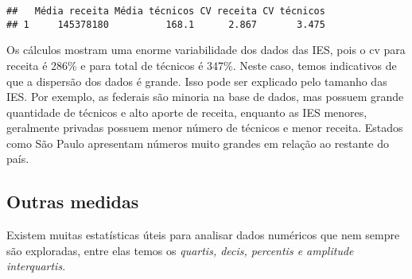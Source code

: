 \documentclass[11pt,]{style/krantz}
\makeatletter
\newenvironment{Shaded}{\begin{snugshade}}{\end{snugshade}}
\newcommand{\DataTypeTok}[1]{\textcolor[rgb]{0.13,0.29,0.53}{#1}}
\newcommand{\DecValTok}[1]{\textcolor[rgb]{0.00,0.00,0.81}{#1}}
\newcommand{\KeywordTok}[1]{\textcolor[rgb]{0.13,0.29,0.53}{\textbf{#1}}}
\newcommand{\NormalTok}[1]{#1}
\newcommand{\OperatorTok}[1]{\textcolor[rgb]{0.81,0.36,0.00}{\textbf{#1}}}
\newcommand{\StringTok}[1]{\textcolor[rgb]{0.31,0.60,0.02}{#1}}
\newenvironment{kframe}{%
\medskip{}
\setlength{\fboxsep}{.8em}
 \def\at@end@of@kframe{}%
 \ifinner\ifhmode%
  \def\at@end@of@kframe{\end{minipage}}%
  \begin{minipage}{\columnwidth}%
 \fi\fi%
 \def\FrameCommand##1{\hskip\@totalleftmargin \hskip-\fboxsep
 \colorbox{shadecolor}{##1}\hskip-\fboxsep
     \hskip-\linewidth \hskip-\@totalleftmargin \hskip\columnwidth}%
 \MakeFramed {\advance\hsize-\width
   \@totalleftmargin\z@ \linewidth\hsize
   \@setminipage}}%
 {\par\unskip\endMakeFramed%
 \at@end@of@kframe}
\renewenvironment{Shaded}{\begin{kframe}}{\end{kframe}}
\theoremstyle{definition}
\theoremstyle{definition}
\theoremstyle{definition}
\theoremstyle{remark}
\makeatother
\begin{document}
\begin{Shaded}
\end{Shaded}

\begin{verbatim}
##   Média receita Média técnicos CV receita CV técnicos
## 1     145378180          168.1      2.867       3.475
\end{verbatim}

Os cálculos mostram uma enorme variabilidade dos dados das IES, pois o cv para receita é 286\% e para total de técnicos é 347\%. Neste caso, temos indicativos de que a dispersão dos dados é grande. Isso pode ser explicado pelo tamanho das IES. Por exemplo, as federais são minoria na base de dados, mas possuem grande quantidade de técnicos e alto aporte de receita, enquanto as IES menores, geralmente privadas possuem menor número de técnicos e menor receita. Estados como São Paulo apresentam números muito grandes em relação ao restante do país.

\hypertarget{outras-medidas}{%
\subsection{Outras medidas}\label{outras-medidas}}

Existem muitas estatísticas úteis para analisar dados numéricos que nem sempre são exploradas, entre elas temos os \emph{quartis, decis, percentis e amplitude interquartis}.
\end{document}
